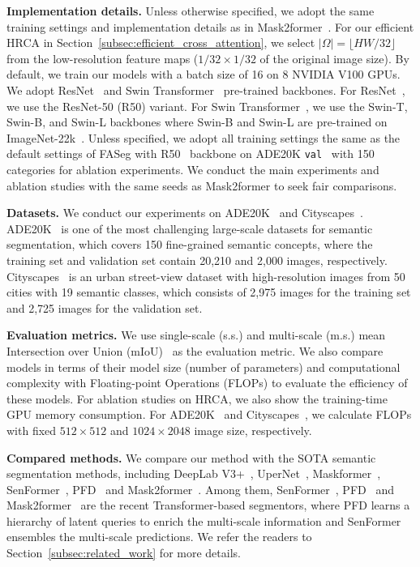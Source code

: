 \noindent\textbf{Implementation details.} Unless otherwise specified, we adopt the same training settings and implementation details as in Mask2former~\cite{cheng2021masked}. For our efficient HRCA in Section~\ref{subsec:efficient_cross_attention}, we select $|\Omega|=\lfloor HW/32 \rfloor$ from the low-resolution feature maps ($1/32\times 1/32$ of the original image size). By default, we train our models with a batch size of 16 on 8 NVIDIA
V100 GPUs. We adopt ResNet~\cite{he2016deep} and Swin Transformer~\cite{swin} pre-trained backbones. For ResNet~\cite{he2016deep}, we use the ResNet-50 (R50) variant. For Swin Transformer~\cite{swin}, we use the Swin-T, Swin-B, and Swin-L backbones where Swin-B and Swin-L are pre-trained on ImageNet-22k~\cite{deng2009imagenet}. Unless specified, we adopt all training settings the same as the default settings of FASeg with R50~\cite{he2016deep} backbone on ADE20K \texttt{val}~\cite{zhou2017scene} with 150 categories for ablation experiments. We conduct the main experiments and ablation studies with the same seeds as Mask2former to seek fair comparisons.

\noindent\textbf{Datasets.} We conduct our experiments on ADE20K~\cite{zhou2017scene} and Cityscapes~\cite{cordts2016cityscapes}. ADE20K~\cite{zhou2017scene} is one of the most challenging large-scale datasets for semantic segmentation, which covers 150 fine-grained semantic concepts, where the training set and validation set contain 20,210 and 2,000 images, respectively. Cityscapes~\cite{cordts2016cityscapes} is an urban street-view dataset with high-resolution images from 50 cities with 19 semantic classes, which consists of 2,975 images for the training set and 2,725 images for the validation set.

\noindent\textbf{Evaluation metrics. } We use single-scale (s.s.) and multi-scale (m.s.) mean Intersection over Union (mIoU)~\cite{everingham2015pascal} as the evaluation metric. We also compare models in terms of their model size (number of parameters) and computational complexity with Floating-point Operations (FLOPs) to evaluate the efficiency of these models. For ablation studies on HRCA, we also show the training-time GPU memory consumption.
For ADE20K~\cite{zhou2017scene} and Cityscapes~\cite{cordts2016cityscapes}, we calculate FLOPs with fixed $512\times 512$ and $1024\times 2048$ image size, respectively.

\noindent\textbf{Compared methods.} We compare our method with the SOTA semantic segmentation methods, including DeepLab V3+~\cite{chen2018encoder}, UperNet~\cite{xiao2018unified}, Maskformer~\cite{cheng2021per}, SenFormer~\cite{bousselham2021efficient}, PFD~\cite{qin2022pyramid} and Mask2former~\cite{cheng2021masked}. Among them, SenFormer~\cite{bousselham2021efficient}, PFD~\cite{qin2022pyramid} and Mask2former~\cite{cheng2021masked} are the recent Transformer-based segmentors, where PFD learns a hierarchy of latent queries to enrich the multi-scale information and SenFormer ensembles the multi-scale predictions. We refer the readers to Section~\ref{subsec:related_work} for more details.

